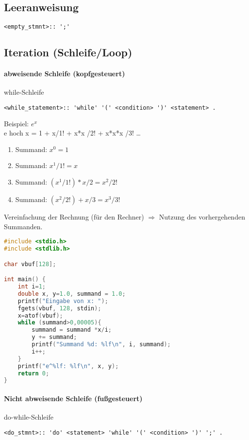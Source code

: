 \subsection{Leeranweisung}
\begin{lstlisting}
<empty_stmnt>:: ';'
\end{lstlisting}

\subsection[Iteration]{Iteration (Schleife/Loop)}
\paragraph{abweisende Schleife (kopfgesteuert)} while-Schleife
\begin{lstlisting}
<while_statement>:: 'while' '(' <condition> ')' <statement> .
\end{lstlisting}

Beispiel: $e^x$\\
e hoch x = 1 + x/1! + x*x /2! + x*x*x /3! …
\begin{enumerate} [label= \arabic* .]
\item  Summand: $x^0=1$
\item  Summand: $x^1/1! = x$
\item  Summand: $(x^1/1!)*x/2 = x^2/2!$
\item  Summand: $(x^2/2!) + x/3 = x^3/3!$
\end{enumerate}
Vereinfachung der Rechnung (für den Rechner) $\Rightarrow$ Nutzung des vorhergehenden Summanden.
\begin{lstlisting}[language=C]
#include <stdio.h>
#include <stdlib.h>

char vbuf[128];

int main() {
	int i=1;
	double x, y=1.0, summand = 1.0;
	printf("Eingabe von x: ");
	fgets(vbuf, 128, stdin);
	x=atof(vbuf);
	while (summand>0,00005){
		summand = summand *x/i;
		y += summand;
		printf("Summand %d: %lf\n", i, summand);
		i++;
	}
	printf("e^%lf: %lf\n", x, y);
	return 0;
}
\end{lstlisting}

\paragraph{Nicht abweisende Schleife (fußgesteuert)} do-while-Schleife
\begin{lstlisting}
<do_stmnt>:: 'do' <statement> 'while' '(' <condition> ')' ';' .
\end{lstlisting}

